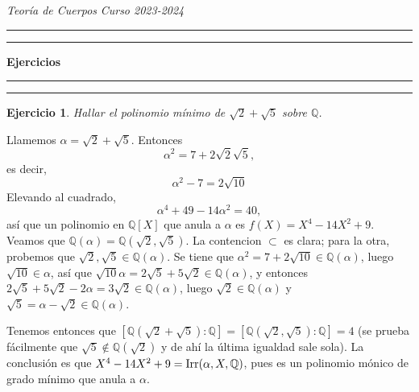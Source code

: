 \documentclass[11pt]{report}
\makeatletter
\renewenvironment{proof}[1][\proofname]{\par
  \pushQED{\qed}%
  \normalfont \topsep\z@skip %
  \trivlist
  \item[\hskip\labelsep
        \itshape
    #1\@addpunct{.}]\ignorespaces
}{%
  \popQED\endtrivlist\@endpefalse
}
\newcommand{\Q}{\mathbb Q}
\newtheorem{ejercicio}{Ejercicio}
\makeatother
\begin{document}


\textit{Teoría de Cuerpos} \hfill \textit{Curso 2023-2024}

\vspace{-5mm}

\begin{center}

	\rule{\textwidth}{1.6pt}\vspace*{-\baselineskip}\vspace*{2pt} %
	\rule{\textwidth}{0.4pt} %
	
	{\LARGE \textbf{Ejercicios}} %
	
	\rule[0.66\baselineskip]{\textwidth}{0.4pt}\vspace*{-\baselineskip}\vspace{3.2pt} %
	\rule[0.66\baselineskip]{\textwidth}{1.6pt} %

\end{center}


\begin{ejercicio}
    Hallar el polinomio mínimo de $\sqrt{2}+\sqrt{5}$ sobre $\Q$.
\end{ejercicio}

\begin{proof}
    Llamemos $\alpha = \sqrt{2}+\sqrt{5}$. Entonces
    \[\alpha^2 = 7+2\sqrt{2}\sqrt{5},\]
    es decir,
    \[\alpha^2-7=2\sqrt{10}\]
    Elevando al cuadrado,
    \[\alpha^4+49-14\alpha^2 = 40,\]
    así que un polinomio en $\Q[X]$ que anula a $\alpha$ es $f(X)=X^4-14X^2+9$. Veamos que $\Q(\alpha) = \Q(\sqrt{2},\sqrt{5})$. La contencion $\subset$ es clara; para la otra, probemos que $\sqrt{2},\sqrt{5} \in \Q(\alpha)$. Se tiene que $\alpha^2=7+2\sqrt{10} \in \Q(\alpha)$, luego $\sqrt{10} \in \alpha$, así que $\sqrt{10}\alpha = 2\sqrt{5}+5\sqrt{2} \in \Q(\alpha)$, y entonces $2\sqrt{5}+5\sqrt{2}-2\alpha = 3\sqrt{2} \in \Q(\alpha)$, luego $\sqrt{2} \in \Q(\alpha)$ y $\sqrt{5} = \alpha - \sqrt{2} \in \Q(\alpha)$.

    Tenemos entonces que $[\Q(\sqrt{2}+\sqrt{5}) \colon \Q] = [\Q(\sqrt{2},\sqrt{5}) \colon \Q] = 4$ (se prueba fácilmente que $\sqrt{5} \not\in \Q(\sqrt{2})$ y de ahí la última igualdad sale sola). La conclusión es que $X^4-14X^2+9 = \textup{Irr}(\alpha,X,\Q)$, pues es un polinomio mónico de grado mínimo que anula a $\alpha$.
\end{proof}
\end{document}
